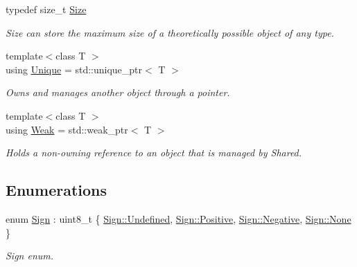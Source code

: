 \begin{DoxyCompactItemize}
typedef size\+\_\+t \hyperlink{namespaceostk_1_1core_1_1types_acf68f214a245e35a7c1994c84dc56746}{Size}
\begin{DoxyCompactList}\small\item\em Size can store the maximum size of a theoretically possible object of any type. \end{DoxyCompactList}\item 
{\footnotesize template$<$class T $>$ }\\using \hyperlink{namespaceostk_1_1core_1_1types_a0ff1c5e84c7c42c929044b1be97ba680}{Unique} = std\+::unique\+\_\+ptr$<$ T $>$
\begin{DoxyCompactList}\small\item\em Owns and manages another object through a pointer. \end{DoxyCompactList}\item 
{\footnotesize template$<$class T $>$ }\\using \hyperlink{namespaceostk_1_1core_1_1types_a0dd80951dd3139e43b5c0b3e5928d08a}{Weak} = std\+::weak\+\_\+ptr$<$ T $>$
\begin{DoxyCompactList}\small\item\em Holds a non-\/owning reference to an object that is managed by Shared. \end{DoxyCompactList}\end{DoxyCompactItemize}
\subsection*{Enumerations}
\begin{DoxyCompactItemize}
\item 
enum \hyperlink{namespaceostk_1_1core_1_1types_ae10e15cf66b50aaec17f4f78c984d7bf}{Sign} \+: uint8\+\_\+t \{ \hyperlink{namespaceostk_1_1core_1_1types_ae10e15cf66b50aaec17f4f78c984d7bfaec0fc0100c4fc1ce4eea230c3dc10360}{Sign\+::\+Undefined}, 
\hyperlink{namespaceostk_1_1core_1_1types_ae10e15cf66b50aaec17f4f78c984d7bfa3289297424e01eda5b788c083bbf3147}{Sign\+::\+Positive}, 
\hyperlink{namespaceostk_1_1core_1_1types_ae10e15cf66b50aaec17f4f78c984d7bfaffb9356ff2b7da85c75c92fa7ea03b8b}{Sign\+::\+Negative}, 
\hyperlink{namespaceostk_1_1core_1_1types_ae10e15cf66b50aaec17f4f78c984d7bfa6adf97f83acf6453d4a6a4b1070f3754}{Sign\+::\+None}
 \}\begin{DoxyCompactList}\small\item\em Sign enum. \end{DoxyCompactList}
\end{DoxyCompactItemize}
